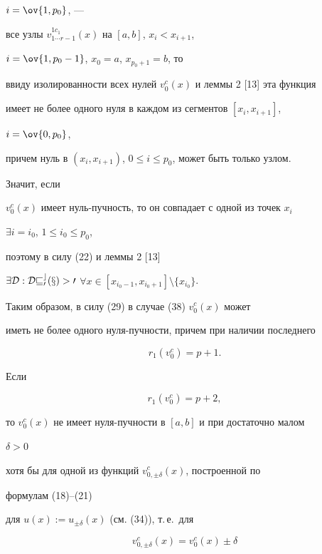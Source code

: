\begin{pf}
$i=\ov{1,p_0}$, --- 


все узлы $v^{1c_1}_{1\dotsb r-1}(x)$ на $[a,b]$, $x_i<x_{i+1}$, 


$i=\ov{1,p_0-1}$, $x_0=a$, $x_{p_0+1}=b$, то 


ввиду изолированности всех нулей $v^c_0(x)$ и леммы 2 [13] эта функция 


имеет не более одного нуля в каждом из сегментов $[x_i,x_{i+1}]$, 


$i=\ov{0,p_0}$, 


причем нуль в $(x_i,x_{i+1})$, $0\le i\le p_0$, может быть только узлом. 


Значит, если 


$v^c_0(x)$ имеет нуль-пучность, то он совпадает с одной из точек $x_i$ 


$\exists i=i_0$, $1\le i_0\le p_0$, 


поэтому в силу (22) и леммы 2 [13] 


$\exists\cal D:\cal D v^c_0(x)>0$ $\forall 


x\in[x_{i_0-1},x_{i_0+1}]\setminus\{x_{i_0}\}$. 


Таким образом, в силу (29) в случае (38) $v^c_0(x)$ может 


иметь не более одного нуля-пучности, причем при наличии последнего 


\begin{equation} 


r_1(v^c_0)=p+1. 


\end{equation} 


 


Если 


\begin{equation} 


r_1(v^c_0)=p+2, 


\end{equation} 


то $v^c_0(x)$ не имеет нуля-пучности в $[a,b]$ и при достаточно малом 


$\delta>0$ 


хотя бы для одной из функций $v^c_{0,\pm\delta}(x)$, построенной по 


формулам (18)--(21)


для $u(x):=u_{\pm\delta}(x)$ (см. (34)), т.\,е.~для 


\begin{equation} 


v^c_{0,\pm\delta}(x)=v^c_0(x)\pm\delta 



\end{equation}
\end{pf}

